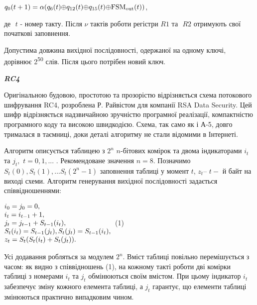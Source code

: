 \documentclass[a4paper]{article}
\newcounter{}
\newcommand\normalsubformula[1]{\text{\mathversion{normal}$#1$}}
\begin{document}
{\centering
 ${q_{{0}}(t+1)=\alpha
(q_{{6}}(t){\oplus}q_{{\text{12}}}(t){\oplus}q_{{\text{15}}}(t){\oplus}\normalsubformula{\text{FSM}}_{{\normalsubformula{\text{out}}}}(t))}$,
\par}

де  $ $  ${t}$ - номер такту. Після  ${\nu }$ тактів роботи регістри 
${\mathit{R1}}$ та $ $ ${\mathit{R2}}$ отримують свої початкові заповнення.

Допустима довжина вихідної послідовності, одержаної на одному ключі, дорівнює
2\textsuperscript{50 } слів. Після цього потрібен новий ключ.


\bigskip

{\centering\bfseries\itshape
RC4
\par}


\bigskip

Оригінальною будовою, простотою та прозорістю відрізняється схема потокового
шифрування RC4, розроблена Р. Райвістом для компанії RSA Data Security. Цей
шифр відрізняється надзвичайною зручністю програмної реалізації, компактністю
програмного коду та високою швидкодією. Схема, так само як і А-5, довго
трималася в таємниці, доки деталі алгоритму не стали відомими в Інтернеті. 

Алгоритм описується  таблицею з  ${2^{{n}}}$   ${n}${}-бітових комірок та двома
індикаторами  ${i_{{t}}}$ та  ${j_{{t}},}$  ${t=0,1,\text{.}\text{.}\text{.}}$
. Рекомендоване значення  ${n=8\text{.}}$ Позначимо  
${S_{{t}}(0),S_{{t}}(1),\text{.}\text{.}\text{.}S_{{t}}(2^{{n}}-1)}$ заповнення
таблиці у момент  ${t}$,  ${z_{{t}}}$–  ${t-}$ й байт на виході схеми. 
Алгоритм генерування вихідної послідовності задається співвідношеннями:


\bigskip

{\centering
  $\begin{matrix}{i_{{0}}=j_{{0}}=0,}\hfill\null
\\i_{{t}}=i_{{t-1}}+1,\hfill\null
\\j_{{t}}=j_{{t-1}}+S_{{t-1}}(i_{{t}}),\hfill\null
\\S_{{t}}(i_{{t}})=S_{{t-1}}(j_{{t}}),S_{{t}}(j_{{t}})=S_{{t-1}}(i_{{t}}),\hfill\null
\\z_{{t}}=S_{{t}}(S_{{t}}(i_{{t}})+S_{{t}}(j_{{t}}))\text{.}\hfill\null
\end{matrix}\hfill $  (1)
\par}


\bigskip

Усі додавання робляться за модулем  ${2^{{n}}}$. Вміст таблиці повільно
перемішується з часом: як видно з співвідношень (1), на кожному такті роботи
дві комірки таблиці з номерами  ${i_{{t}}}$ та  ${j_{{t}}}$ обмінюються своїм
вмістом. При цьому індикатор  ${i_{{t}}}$ забезпечує зміну кожного елемента
таблиці, а  ${j_{{t}}}$ гарантує, що елементи таблиці змінюються практично
випадковим чином.
\end{document}
